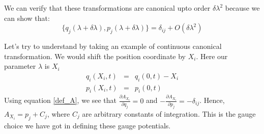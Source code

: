 \documentclass[11pt,a4paper]{article}
\begin{document}
We can verify that these transformations are canonical upto order $\delta \lambda ^2$ because we can show that:
\begin{equation}
\{q_j(\lambda + \delta \lambda), p_j(\lambda + \delta \lambda)\} = \delta_{ij} + O(\delta \lambda ^2)
\end{equation}

Let's try to understand by taking an example of continuous canonical transformation. We would shift the position coordinate by $X_i$. Here our parameter $\lambda$ is $X_i$
\begin{eqnarray}
 q_i(X_i,t) &=& q_i(0,t) - X_i \\
p_i(X_i,t)&=& p_i(0,t)
\end{eqnarray}
Using equation \ref{def_A}, we see that $\frac{\partial A_{X_i}}{\partial q_j}=0$ and $-\frac{\partial A_{X_i}}{\partial p_j}=-\delta_{ij}$. Hence, $A_{X_i}=p_j + C_j$, where $C_j$ are arbitrary constants of integration. This is the gauge choice we have got in defining these gauge potentials. 

 


\end{document}
